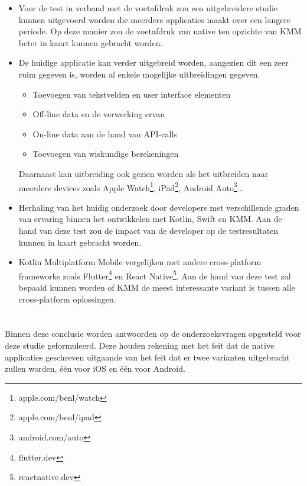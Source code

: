 \begin{itemize}
    \item Voor de test in verband met de voetafdruk zou een uitgebreidere studie kunnen uitgevoerd worden die meerdere applicaties maakt over een langere periode. Op deze manier zou de voetafdruk van native ten opzichte van KMM beter in kaart kunnen gebracht worden.
    
    \item De huidige applicatie kan verder uitgebreid worden, aangezien dit een zeer ruim gegeven is, worden al enkele mogelijke uitbreidingen gegeven.
    \begin{itemize}
        \item Toevoegen van tekstvelden en user interface elementen
        \item Off-line data en de verwerking ervan
        \item On-line data aan de hand van API-calls
        \item Toevoegen van wiskundige berekeningen
    \end{itemize}
    
    Daarnaast kan uitbreiding ook gezien worden als het uitbreiden naar meerdere devices zoals Apple Watch\footnote{apple.com/benl/watch}, iPad\footnote{apple.com/benl/ipad}, Android Auto\footnote{android.com/auto}... 
    
    \item Herhaling van het huidig onderzoek door developers met verschillende graden van ervaring binnen het ontwikkelen met Kotlin, Swift en KMM. Aan de hand van deze test zou de impact van de developer op de testresultaten kunnen in kaart gebracht worden.
    
    \item Kotlin Multiplatform Mobile vergelijken met andere cross-platform frameworks zoals Flutter\footnote{flutter.dev} en React Native\footnote{reactnative.dev}. Aan de hand van deze test zal bepaald kunnen worden of KMM de meest interessante variant is tussen alle cross-platform oplossingen.
\end{itemize}


\section{}
\label{sec:C-algemene-conclusie}    
Binnen deze conclusie worden antwoorden op de onderzoeksvragen opgesteld voor deze studie geformuleerd. Deze houden rekening met het feit dat de native applicaties geschreven uitgaande van het feit dat er twee varianten uitgebracht zullen worden, één voor iOS en één voor Android.

